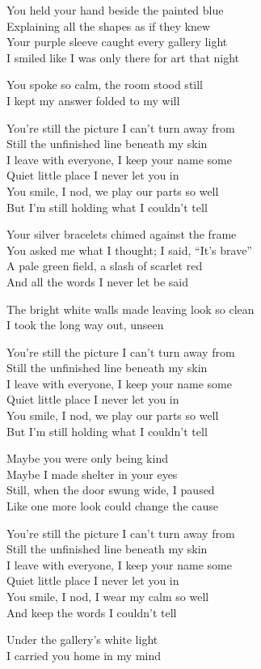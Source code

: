 \begin{lyrics}
You held your hand beside the painted blue\\
Explaining all the shapes as if they knew\\
Your purple sleeve caught every gallery light\\
I smiled like I was only there for art that night

You spoke so calm, the room stood still\\
I kept my answer folded to my will

You’re still the picture I can’t turn away from\\
Still the unfinished line beneath my skin\\
I leave with everyone, I keep your name some\\
Quiet little place I never let you in\\
You smile, I nod, we play our parts so well\\
But I’m still holding what I couldn’t tell

Your silver bracelets chimed against the frame\\
You asked me what I thought; I said, “It’s brave”\\
A pale green field, a slash of scarlet red\\
And all the words I never let be said

The bright white walls made leaving look so clean\\
I took the long way out, unseen

You’re still the picture I can’t turn away from\\
Still the unfinished line beneath my skin\\
I leave with everyone, I keep your name some\\
Quiet little place I never let you in\\
You smile, I nod, we play our parts so well\\
But I’m still holding what I couldn’t tell


Maybe you were only being kind\\
Maybe I made shelter in your eyes\\
Still, when the door swung wide, I paused\\
Like one more look could change the cause

You’re still the picture I can’t turn away from\\
Still the unfinished line beneath my skin\\
I leave with everyone, I keep your name some\\
Quiet little place I never let you in\\
You smile, I nod, I wear my calm so well\\
And keep the words I couldn’t tell

Under the gallery’s white light\\
I carried you home in my mind
\end{lyrics}

